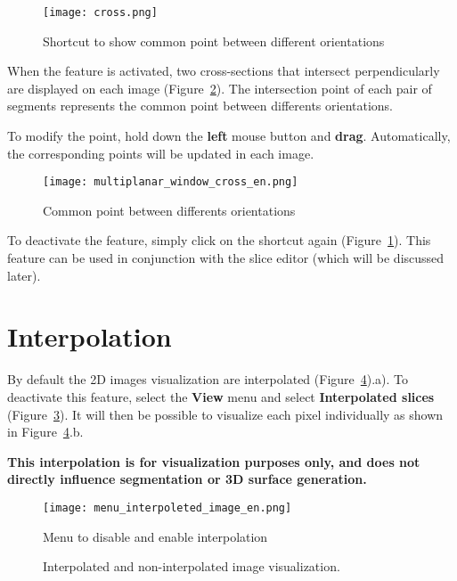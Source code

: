 \begin{figure}[!htb]
\centering
\texttt{[image: cross.png]}
\caption{Shortcut to show common point between different orientations}
\label{fig:cross_icon}
\end{figure}

When the feature is activated, two cross-sections that intersect perpendicularly are displayed on each image (Figure~\ref{fig:cross_all}). The intersection point of each pair of segments represents the common point between differents orientations.

\newpage

To modify the point, hold down the \textbf{left} mouse button and \textbf{drag}. Automatically, the corresponding points will be updated in each image.

\begin{figure}[!htb]
\centering
\texttt{[image: multiplanar\_window\_cross\_en.png]}
\caption{Common point between differents orientations}
\label{fig:cross_all}
\end{figure}

To deactivate the feature, simply click on the shortcut again (Figure~\ref{fig:cross_icon}). This feature can be used in conjunction with the slice editor (which will be discussed later).

\section{Interpolation}

By default the 2D images visualization are interpolated (Figure~\ref{fig:interp}).a). To deactivate this feature, select the \textbf{View} menu and select \textbf{Interpolated slices} (Figure~\ref{fig:menu_interpoleted_image_pt}). It will then be possible to visualize each pixel individually as shown in Figure~\ref{fig:interp}.b.

\textbf{This interpolation is for visualization purposes only, and does not directly influence segmentation or 3D surface generation.}

\begin{figure}[!htb]
\centering
\texttt{[image: menu\_interpoleted\_image\_en.png]}
\caption{Menu to disable and enable interpolation}
\label{fig:menu_interpoleted_image_pt}
\end{figure}


\begin{figure}[!htb]
  \centering
    \qquad
  \hfill
  \caption{Interpolated and non-interpolated image visualization.}
  \label{fig:interp}
\end{figure}

